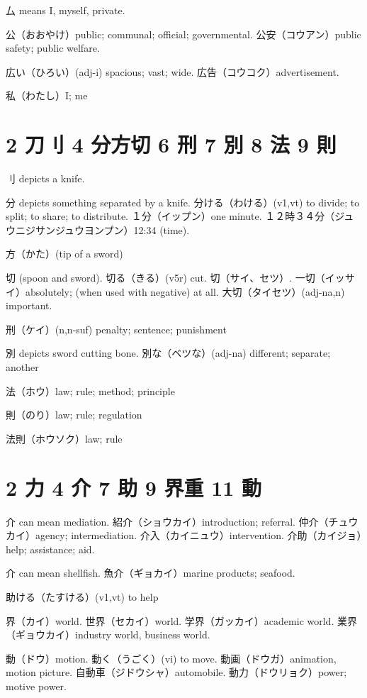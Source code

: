 厶 means I, myself, private.

公（おおやけ）public; communal; official; governmental.
公安（コウアン）public safety; public welfare.

広い（ひろい）(adj-i) spacious; vast; wide.
広告（コウコク）advertisement.

私（わたし）I; me

\section{2 刀刂 4 分方切 6 刑 7 別 8 法 9 則}

刂 depicts a knife.

分 depicts something separated by a knife.
分ける（わける）(v1,vt) to divide; to split; to share; to distribute.
１分（イップン）one minute.
１２時３４分（ジュウニジサンジュウヨンプン）12:34 (time).

方（かた）(tip of a sword)

切 (spoon and sword).
切る（きる）(v5r) cut.
切（サイ、セツ）.
一切（イッサイ）absolutely; (when used with negative) at all.
大切（タイセツ）(adj-na,n) important.

刑（ケイ）(n,n-suf) penalty; sentence; punishment

別 depicts sword cutting bone.
別な（ベツな）(adj-na) different; separate; another

法（ホウ）law; rule; method; principle

則（のり）law; rule; regulation

法則（ホウソク）law; rule

\section{2 力 4 介 7 助 9 界重 11 動}

介 can mean mediation.
紹介（ショウカイ）introduction; referral.
仲介（チュウカイ）agency; intermediation.
介入（カイニュウ）intervention.
介助（カイジョ）help; assistance; aid.

介 can mean shellfish.
魚介（ギョカイ）marine products; seafood.

助ける（たすける）(v1,vt) to help

界（カイ）world.
世界（セカイ）world.
学界（ガッカイ）academic world.
業界（ギョウカイ）industry world, business world.

動（ドウ）motion.
動く（うごく）(vi) to move.
動画（ドウガ）animation, motion picture.
自動車（ジドウシャ）automobile.
動力（ドウリョク）power; motive power.

